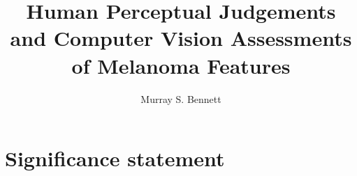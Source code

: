 \documentclass[a4paper, natbib, doc, 12pt]{apa7}
\title{Human Perceptual Judgements and Computer Vision Assessments of Melanoma Features}
\author{Murray S. Bennett}
\begin{document}
\maketitle

\setlength{\parskip}{0pt}


\section{Significance statement}






\end{document}
